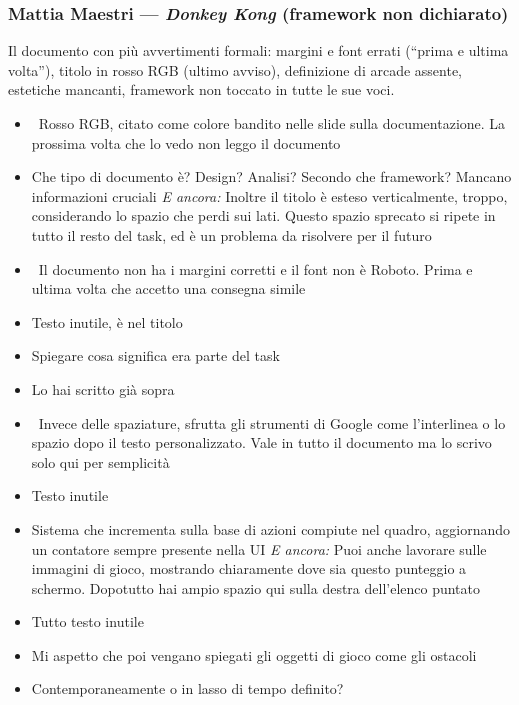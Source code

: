 \subsubsection{Mattia Maestri --- \emph{Donkey Kong} (framework non
dichiarato)}
Il documento con più avvertimenti formali: margini e font errati (``prima e
ultima volta''), titolo in rosso RGB (ultimo avviso), definizione di arcade
assente, estetiche mancanti, framework non toccato in tutte le sue voci.
{\small
\begin{itemize}
  \item {} \rvAvviso\ Rosso RGB, citato come colore bandito nelle slide sulla documentazione. La prossima volta che lo vedo non leggo il documento
  \item {} Che tipo di documento è? Design? Analisi? Secondo che framework? Mancano informazioni cruciali \emph{E ancora:} Inoltre il titolo è esteso verticalmente, troppo, considerando lo spazio che perdi sui lati. Questo spazio sprecato si ripete in tutto il resto del task, ed è un problema da risolvere per il futuro
  \item {} \rvAvviso\ Il documento non ha i margini corretti e il font non è Roboto. Prima e ultima volta che accetto una consegna simile
  \item {} Testo inutile, è nel titolo
  \item {} Spiegare cosa significa era parte del task
  \item {} Lo hai scritto già sopra
  \item \rvVuoto\ Invece delle spaziature, sfrutta gli strumenti di Google come l'interlinea o lo spazio dopo il testo personalizzato. Vale in tutto il documento ma lo scrivo solo qui per semplicità
  \item {} Testo inutile
  \item {} Sistema che incrementa sulla base di azioni compiute nel quadro, aggiornando un contatore sempre presente nella UI \emph{E ancora:} Puoi anche lavorare sulle immagini di gioco, mostrando chiaramente dove sia questo punteggio a schermo. Dopotutto hai ampio spazio qui sulla destra dell'elenco puntato
  \item {} Tutto testo inutile
  \item {} Mi aspetto che poi vengano spiegati gli oggetti di gioco come gli ostacoli
  \item {} Contemporaneamente o in lasso di tempo definito?

\end{itemize}}
